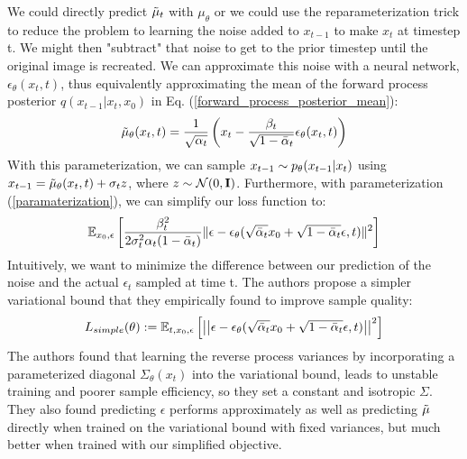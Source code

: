 \documentclass{article}
\begin{document}
We could directly predict $\Tilde{\mu}_t$ with $\mu_\theta$ or we could use the reparameterization trick to reduce the problem to learning the noise added to $x_{t-1}$ to make $x_t$ at timestep t. We might then "subtract" that noise to get to the prior timestep until the original image is recreated. We can approximate this noise with a neural network, $\epsilon_\theta(x_t,t)$,  thus equivalently approximating the mean of the forward process posterior $q(x_{t-1}|x_t,x_0)$ in Eq. (\ref{forward_process_posterior_mean}):
\begin{align}
    \Tilde{\mu}_\theta(x_t,t) = \frac{1}{\sqrt{\alpha_t}} \left( x_t - \frac{\beta_{t}}{\sqrt{1 - \bar{\alpha}_t}}\epsilon_\theta(x_t,t) \right) \label{paramaterization}
\end{align}
With this parameterization, we can sample $x_{t-1} \sim p_\theta(x_{t-1}|x_t)$ using $x_{t-1} = \Tilde{\mu}_\theta(x_t,t) + \sigma_t z$, where $z\sim\mathcal{N}(0,\mathbf{I})$. Furthermore, with parameterization (\ref{paramaterization}), we can simplify our loss function to:
\begin{align}
    \mathbb{E}_{x_0,\epsilon} \left[ \frac{\beta_{t}^2}{2\sigma_t^2\alpha_t(1-\bar{\alpha}_t)} \lVert\epsilon - \epsilon_\theta(\sqrt{\bar{\alpha}_t}x_0 + \sqrt{1-\bar{\alpha}_t}\epsilon,t)\rVert^2\right]
\end{align}
Intuitively, we want to minimize the difference between our prediction of the noise and the actual $\epsilon_t$ sampled at time t. The authors propose a simpler variational bound that they empirically found to improve sample quality:
\begin{align}
    L_{simple}(\theta) := \mathbb{E}_{t,x_0,\epsilon}\left[\left|\left| \epsilon - \epsilon_\theta (\sqrt{\bar{\alpha}_t}x_0 + \sqrt{1-\bar{\alpha}_t}\epsilon,t) \right|\right|^2\right]
\end{align}
The authors found that learning the reverse process variances by incorporating a parameterized diagonal $\Sigma_\theta(x_t)$ into the variational bound, leads to unstable training and poorer sample efficiency, so they set a constant and isotropic $\Sigma$. They also found predicting $\epsilon$ performs approximately as well as predicting $\Tilde{\mu}$ directly when trained on the variational bound with fixed variances, but much better when trained with our simplified objective.
\end{document}
